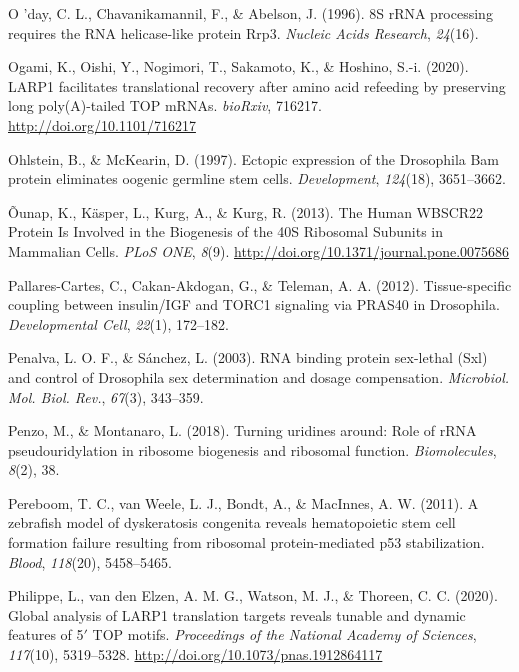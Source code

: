 \documentclass[12pt,twoside]{reedthesis}
\newlength{\cslhangindent}
\newenvironment{cslreferences}%
  {\setlength{\parindent}{0pt}%
  \everypar{\setlength{\hangindent}{\cslhangindent}}\ignorespaces}%
  {\par}
\begin{document}
\begin{cslreferences}
\leavevmode\hypertarget{ref-oday8SRRNAProcessing1996}{}%
O 'day, C. L., Chavanikamannil, F., \& Abelson, J. (1996). 8S rRNA processing requires the RNA helicase-like protein Rrp3. \emph{Nucleic Acids Research}, \emph{24}(16).

\leavevmode\hypertarget{ref-ogamiLARP1FacilitatesTranslational2020}{}%
Ogami, K., Oishi, Y., Nogimori, T., Sakamoto, K., \& Hoshino, S.-i. (2020). LARP1 facilitates translational recovery after amino acid refeeding by preserving long poly(A)-tailed TOP mRNAs. \emph{bioRxiv}, 716217. \url{http://doi.org/10.1101/716217}

\leavevmode\hypertarget{ref-ohlsteinEctopicExpressionDrosophila1997}{}%
Ohlstein, B., \& McKearin, D. (1997). Ectopic expression of the Drosophila Bam protein eliminates oogenic germline stem cells. \emph{Development}, \emph{124}(18), 3651--3662.

\leavevmode\hypertarget{ref-ounapHumanWBSCR22Protein2013}{}%
Õunap, K., Käsper, L., Kurg, A., \& Kurg, R. (2013). The Human WBSCR22 Protein Is Involved in the Biogenesis of the 40S Ribosomal Subunits in Mammalian Cells. \emph{PLoS ONE}, \emph{8}(9). \url{http://doi.org/10.1371/journal.pone.0075686}

\leavevmode\hypertarget{ref-Pallares-Cartes2012a}{}%
Pallares-Cartes, C., Cakan-Akdogan, G., \& Teleman, A. A. (2012). Tissue-specific coupling between insulin/IGF and TORC1 signaling via PRAS40 in Drosophila. \emph{Developmental Cell}, \emph{22}(1), 172--182.

\leavevmode\hypertarget{ref-Penalva2003}{}%
Penalva, L. O. F., \& Sánchez, L. (2003). RNA binding protein sex-lethal (Sxl) and control of Drosophila sex determination and dosage compensation. \emph{Microbiol. Mol. Biol. Rev.}, \emph{67}(3), 343--359.

\leavevmode\hypertarget{ref-Penzo2018}{}%
Penzo, M., \& Montanaro, L. (2018). Turning uridines around: Role of rRNA pseudouridylation in ribosome biogenesis and ribosomal function. \emph{Biomolecules}, \emph{8}(2), 38.

\leavevmode\hypertarget{ref-Pereboom2011a}{}%
Pereboom, T. C., van Weele, L. J., Bondt, A., \& MacInnes, A. W. (2011). A zebrafish model of dyskeratosis congenita reveals hematopoietic stem cell formation failure resulting from ribosomal protein-mediated p53 stabilization. \emph{Blood}, \emph{118}(20), 5458--5465.

\leavevmode\hypertarget{ref-philippeGlobalAnalysisLARP12020}{}%
Philippe, L., van den Elzen, A. M. G., Watson, M. J., \& Thoreen, C. C. (2020). Global analysis of LARP1 translation targets reveals tunable and dynamic features of 5\({'}\) TOP motifs. \emph{Proceedings of the National Academy of Sciences}, \emph{117}(10), 5319--5328. \url{http://doi.org/10.1073/pnas.1912864117}


\end{cslreferences}
\end{document}
